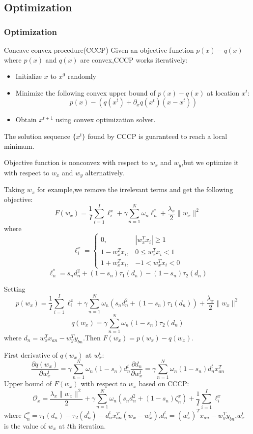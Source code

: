 \documentclass{beamer}
\begin{document}
\begin{CJK*}{UTF8}{gbsn}
\subsection{Optimization}
\begin{frame}[allowframebreaks]\frametitle{Optimization}
\begin{block}{Concave convex procedure(CCCP)}
Given an objective function $p(x)-q(x)$ where $p(x)$ and $q(x)$ are convex,CCCP works iteratively:
\begin{itemize}
\item Initialize $x$ to $x^{0}$ randomly
\item Minimize the following convex upper bound of $p(x)-q(x)$ at location $x^{t}$:
\[
p(x)-(q(x^{t})+\partial_xq(x^{t})(x-x^{t}))
\]
\item Obtain $x^{t+1}$ using convex optimization solver.
\end{itemize}
The solution sequence $\{x^{t}\}$ found by CCCP is guaranteed to reach a local minimum.
\end{block}

Objective function is nonconvex with respect to $w_x$ and $w_y$,but we optimize it with respect to $w_x$ and $w_y$ alternatively.

Taking $w_x$ for example,we remove the irrelevant terms and get the following objective:
\begin{displaymath}
F(w_x)=\frac{1}{I}\sum_{i=1}^I\ell_i^x+\gamma\sum_{n=1}^N\omega_n\ell_n^\ast+\frac{\lambda_x}{2}\|w_x\|^2
\end{displaymath}
where
\begin{displaymath}
\ell_i^x=
\begin{cases}
0,& |w_x^Tx_i|\geq 1\\
1-w_x^Tx_i,& 0\leq w_x^Tx_i<1\\
1+w_x^Tx_i,& -1<w_x^Tx_i<0
\end{cases}
\end{displaymath}
\begin{displaymath}
\ell_n^\ast=s_nd_n^2+(1-s_n)\tau_1(d_n)-(1-s_n)\tau_2(d_n)
\end{displaymath}

Setting
\[
p(w_x)=\frac{1}{I}\sum_{i=1}^I\ell_i^x+\gamma\sum_{n=1}^N\omega_n(s_nd_n^2+(1-s_n)\tau_1(d_n))+\frac{\lambda_x}{2}\|w_x\|^2
\]
\[
q(w_x)=\gamma\sum_{n=1}^N\omega_n(1-s_n)\tau_2(d_n)
\]
where $d_n=w_x^Tx_{an}-w_y^Ty_{bn}$.Then $F(w_x)=p(w_x)-q(w_x)$.

First derivative of $q(w_x)$ at $w_x^t$:
\[
\frac{\partial q(w_x)}{\partial w_x^t}=\gamma\sum_{n=1}^N\omega_n(1-s_n)d_n^t\frac{\partial d_n}{\partial w_x^t}=\gamma\sum_{n=1}^N\omega_n(1-s_n)d_n^tx_{an}^T
\]
Upper bound of $F(w_x)$ with respect to $w_x$ based on CCCP:
\begin{displaymath}
\mathcal{O}_x=\frac{\lambda_x\|w_x\|^2}{2}+\gamma\sum_{n=1}^N\omega_n(s_nd_n^2+(1-s_n)\zeta_n^x)+\frac{1}{I}\sum_{i=1}^I\ell_i^x
\end{displaymath}
where $\zeta_n^x=\tau_1(d_n)-\tau_2(d_n^t)-d_n^tx_{an}^T(w_x-w_x^t)$,$d_n^t=(w_x^t)^Tx_{an}-w_y^Ty_{bn}$,$w_x^t$ is the value of $w_x$ at $t$th iteration.


\end{frame}
\end{CJK*}
\end{document}
